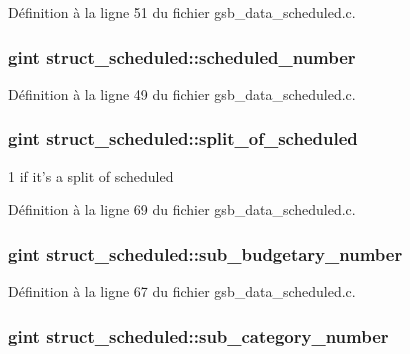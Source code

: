 Définition à la ligne 51 du fichier gsb\_\-data\_\-scheduled.c.

\subsubsection[{scheduled\_\-number}]{\setlength{\rightskip}{0pt plus 5cm}gint {\bf struct\_\-scheduled::scheduled\_\-number}}\label{structstruct__scheduled_a0a24fe290c111decdfeeeaa4e456728c}


Définition à la ligne 49 du fichier gsb\_\-data\_\-scheduled.c.

\subsubsection[{split\_\-of\_\-scheduled}]{\setlength{\rightskip}{0pt plus 5cm}gint {\bf struct\_\-scheduled::split\_\-of\_\-scheduled}}\label{structstruct__scheduled_ac691c0fdd91afb2eef2a9a27a04ab1ab}
1 if it's a split of scheduled 

Définition à la ligne 69 du fichier gsb\_\-data\_\-scheduled.c.

\subsubsection[{sub\_\-budgetary\_\-number}]{\setlength{\rightskip}{0pt plus 5cm}gint {\bf struct\_\-scheduled::sub\_\-budgetary\_\-number}}\label{structstruct__scheduled_aa021b0f41c0ff132115194f9a7eff0a4}


Définition à la ligne 67 du fichier gsb\_\-data\_\-scheduled.c.

\subsubsection[{sub\_\-category\_\-number}]{\setlength{\rightskip}{0pt plus 5cm}gint {\bf struct\_\-scheduled::sub\_\-category\_\-number}}\label{structstruct__scheduled_aebe0abf350cb5de4756a1cc5da25db8a}



